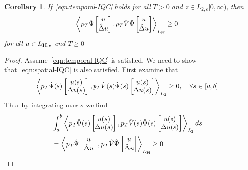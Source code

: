 \documentclass[journal,10pt,doublecolumn,twoside,a4paper]{IEEEtran}
\newtheorem{corollary}{Corollary}
\begin{document}
\begin{corollary}
    If~\eqref{eqn:temporal-IQC} holds for all $T >0$ and $z\in L_{2,e}[0,\infty)$, then
\begin{equation}\label{eqn:spatial-IQC}
    \left\langle p_T \hat{\Psi}\begin{bmatrix}u\\ \hat{\Delta} u\end{bmatrix}, p_T \hat{V} \hat{\Psi}\begin{bmatrix}u \\ \hat{\Delta}u\end{bmatrix} \right\rangle_{L_{\mathbf{H}}} \geq 0
\end{equation}
    for all $u\in L_{\mathbf{H},e}$ and $T\geq 0$
\end{corollary}
\begin{proof}
    Assume~\eqref{eqn:temporal-IQC} is satisfied. We need to show that~\eqref{eqn:spatial-IQC} is also satisfied.
    First examine that 
    \begin{equation*}
        \left\langle p_T\hat{\Psi}(s)\begin{bmatrix}u(s)\\\Delta u(s)\end{bmatrix}, p_T\hat{V}(s)\hat{\Psi}(s)\begin{bmatrix}u(s)\\{\Delta}u(s)\end{bmatrix} \right\rangle_{L_2} \geq 0, \quad \forall s\in[a,b]
    \end{equation*}
    Thus by integrating over $s$ we find
    \begin{align*}
        &\int_a^b \left\langle p_T\hat{\Psi}(s)\begin{bmatrix}u(s)\\\Delta u(s)\end{bmatrix}, p_T\hat{V}(s)\hat{\Psi}(s)\begin{bmatrix}u(s)\\{\Delta}u(s)\end{bmatrix} \right\rangle_{L_2} ds\\
        &= \left\langle p_T \hat{\Psi}\begin{bmatrix}u\\ \hat{\Delta} u\end{bmatrix}, p_T \hat{V} \hat{\Psi}\begin{bmatrix}u \\ \hat{\Delta}u\end{bmatrix} \right\rangle_{L_{\mathbf{H}}} \geq 0
    \end{align*}
\end{proof}
\end{document}
